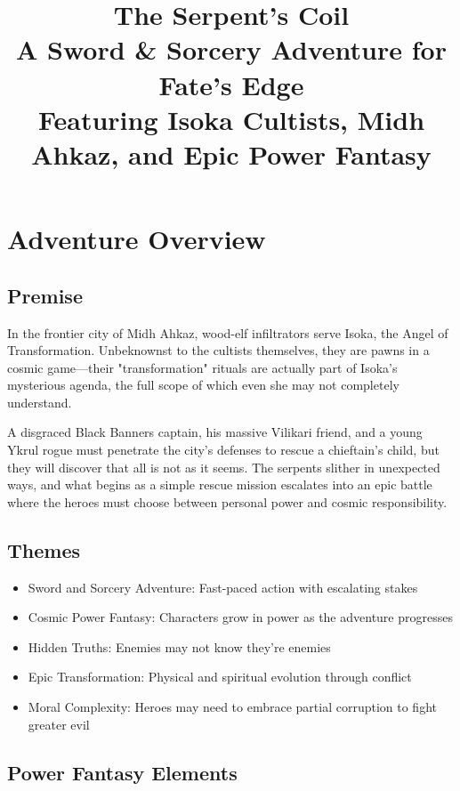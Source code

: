 \documentclass[12pt,twoside]{article}
\title{
  \textbf{\Huge The Serpent's Coil} \\
  \Large A Sword \& Sorcery Adventure for Fate's Edge \\
  \vspace{1cm}
  \large Featuring Isoka Cultists, Midh Ahkaz, and Epic Power Fantasy
}
\author{}
\date{}
\begin{document}
\maketitle
\thispagestyle{empty}

\newpage
\setcounter{page}{1}

\tableofcontents
\newpage

\section{Adventure Overview}

\subsection{Premise}

In the frontier city of Midh Ahkaz, wood-elf infiltrators serve Isoka, the Angel of Transformation. Unbeknownst to the cultists themselves, they are pawns in a cosmic game—their "transformation" rituals are actually part of Isoka's mysterious agenda, the full scope of which even she may not completely understand.

A disgraced Black Banners captain, his massive Vilikari friend, and a young Ykrul rogue must penetrate the city's defenses to rescue a chieftain's child, but they will discover that all is not as it seems. The serpents slither in unexpected ways, and what begins as a simple rescue mission escalates into an epic battle where the heroes must choose between personal power and cosmic responsibility.

\subsection{Themes}

\begin{itemize}
  \item Sword and Sorcery Adventure: Fast-paced action with escalating stakes
  \item Cosmic Power Fantasy: Characters grow in power as the adventure progresses
  \item Hidden Truths: Enemies may not know they're enemies
  \item Epic Transformation: Physical and spiritual evolution through conflict
  \item Moral Complexity: Heroes may need to embrace partial corruption to fight greater evil
\end{itemize}

\subsection{Power Fantasy Elements}
\end{document}
